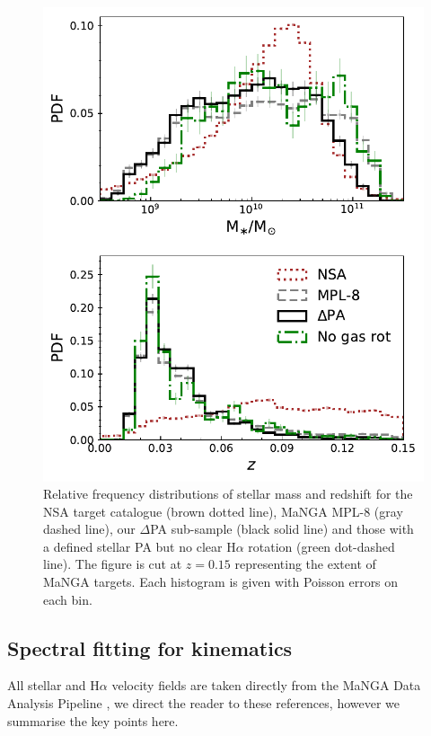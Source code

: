\documentclass[fleqn,usenatbib]{mnras}
\begin{document}
\begin{figure}
	\includegraphics[width=\linewidth]{total_pop/mpl8_pa_nsa_stelmass_z.pdf}
    \caption{Relative frequency distributions of stellar mass and redshift for the NSA target catalogue (brown dotted line), MaNGA MPL-8 (gray dashed line), our $\Delta$PA sub-sample (black solid line) and those with a defined stellar PA but no clear H$\alpha$ rotation (green dot-dashed line). The figure is cut at $z=0.15$ representing the extent of MaNGA targets. Each histogram is given with Poisson errors on each bin.}
    \label{fig:samp_cons}
\end{figure}

\subsection{Spectral fitting for kinematics}
All stellar and H$\alpha$ velocity fields are taken directly from the MaNGA Data Analysis Pipeline \citep[DAP;][for an overview and emission line modelling respectively]{westfall2019, belfoire2019}, we direct the reader to these references, however we summarise the key points here.
\end{document}
